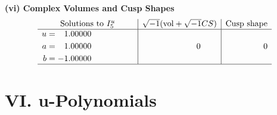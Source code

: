 \documentclass[1p]{elsarticle_modified}
\theoremstyle{definition}
\newcommand{\I}{\sqrt{-1}}
\begin{document}
\newpage\flushleft \textbf{(vi) Complex Volumes and Cusp Shapes}
$$\begin{array}{c|c|c}  
\text{Solutions to }I^u_{5}& \I (\text{vol} + \sqrt{-1}CS) & \text{Cusp shape}\\
 \hline 
\begin{aligned}
u &= \phantom{-}1.00000\phantom{ +0.000000I} \\
a &= \phantom{-}1.00000\phantom{ +0.000000I} \\
b &= -1.00000\phantom{ +0.000000I}\end{aligned}
 & \phantom{-0.000000 } 0 & \phantom{-0.000000 } 0\\
 \hline 
 \end{array}$$\newpage
\newpage\renewcommand{\arraystretch}{1}
\centering \section*{ VI. u-Polynomials}
\end{document}
